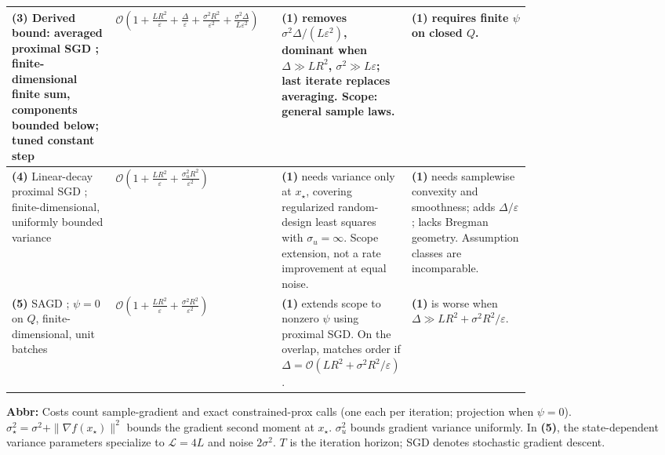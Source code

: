 \begin{table}[tp]
\begin{threeparttable}
\begin{tabularx}{\linewidth}{@{}>{\raggedright\arraybackslash}p{0.20\linewidth}>{\raggedright\arraybackslash}p{0.32\linewidth}>{\raggedright\arraybackslash}p{0.25\linewidth}>{\raggedright\arraybackslash}X@{}}
\midrule
\textbf{(3)} Derived bound: averaged proximal SGD \citep[Theorem 12.5]{scscGarrigos2024v3}; finite-dimensional finite sum, components bounded below; tuned constant step & $\mathcal{O}\!\left(1+\frac{LR^2}{\varepsilon}+\frac{\Delta}{\varepsilon}\right.$\newline $\left.{}+\frac{\sigma^2R^2}{\varepsilon^2}+\frac{\sigma^2\Delta}{L\varepsilon^2}\right)$ & \textbf{(1)} removes $\sigma^2\Delta/(L\varepsilon^2)$, dominant when $\Delta\gg LR^2$, $\sigma^2\gg L\varepsilon$; last iterate replaces averaging. Scope: general sample laws. & \textbf{(1)} requires finite $\psi$ on closed $Q$. \\
\midrule
\textbf{(4)} Linear-decay proximal SGD \citep[Theorems 3.4/C.3]{scscLiu2026v4}; finite-dimensional, uniformly bounded variance & $\mathcal{O}\!\left(1+\frac{LR^2}{\varepsilon}+\frac{\sigma_u^2R^2}{\varepsilon^2}\right)$ & \textbf{(1)} needs variance only at $x_\star$, covering regularized random-design least squares with $\sigma_u=\infty$. Scope extension, not a rate improvement at equal noise. & \textbf{(1)} needs samplewise convexity and smoothness; adds $\Delta/\varepsilon$; lacks Bregman geometry. Assumption classes are incomparable. \\
\midrule
\textbf{(5)} SAGD \citep[Corollary 1, (3.6)]{scscIlandarideva2024v3}; $\psi=0$ on $Q$, finite-dimensional, unit batches & $\mathcal{O}\!\left(1+\frac{LR^2}{\varepsilon}+\frac{\sigma^2R^2}{\varepsilon^2}\right)$ & \textbf{(1)} extends scope to nonzero $\psi$ using proximal SGD. On the overlap, matches order if $\Delta=\mathcal{O}(LR^2+\sigma^2R^2/\varepsilon)$. & \textbf{(1)} is worse when $\Delta\gg LR^2+\sigma^2R^2/\varepsilon$. \\
\bottomrule
\end{tabularx}
\begin{tablenotes}[flushleft]\footnotesize
\item[] \textbf{Abbr:} Costs count sample-gradient and exact constrained-prox calls (one each per iteration; projection when $\psi=0$). $\sigma_\star^2=\sigma^2+\|\nabla f(x_\star)\|^2$ bounds the gradient second moment at $x_\star$. $\sigma_u^2$ bounds gradient variance uniformly. In \textbf{(5)}, the state-dependent variance parameters specialize to $\mathcal{L}=4L$ and noise $2\sigma^2$. $T$ is the iteration horizon; SGD denotes stochastic gradient descent.
\end{tablenotes}
\end{threeparttable}
\end{table}
\clearpage
